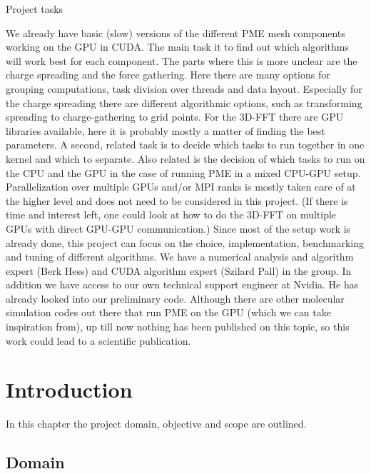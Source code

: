 \documentclass[12pt,a4paper]{report}
\begin{document}
Project tasks

We already have basic (slow) versions of the different PME mesh components working on the GPU in CUDA. The main task it to find out which algorithms will work best for each component. The parts where this is more unclear are the charge spreading and the force gathering. Here there are many options for grouping computations, task division over threads and data layout. Especially for the charge spreading there are different algorithmic options, such as transforming spreading to charge-gathering to grid points. For the 3D-FFT there are GPU libraries available, here it is probably mostly a matter of finding the best parameters. A second, related task is to decide which tasks to run together in one kernel and which to separate. Also related is the decision of which tasks to run on the CPU and the GPU in the case of running PME in a mixed CPU-GPU setup. Parallelization over multiple GPUs and/or MPI ranks is mostly taken care of at the higher level and does not need to be considered in this project. (If there is time and interest left, one could look at how to do the 3D-FFT on multiple GPUs with direct GPU-GPU communication.) Since most of the setup work is already done, this project can focus on the choice, implementation, benchmarking and tuning of different algorithms. We have a numerical analysis and algorithm expert (Berk Hess) and CUDA algorithm expert (Szilard Pall) in the group. In addition we have access to our own technical support engineer at Nvidia. He has already looked into our preliminary code. Although there are other molecular simulation codes out there that run PME on the GPU (which we can take inspiration from), up till now nothing has been published on this topic, so this work could lead to a scientific publication.


\fi












\newpage
\chapter{Introduction}

In this chapter the project domain, objective and scope are outlined.

\section{Domain}
\end{document}
